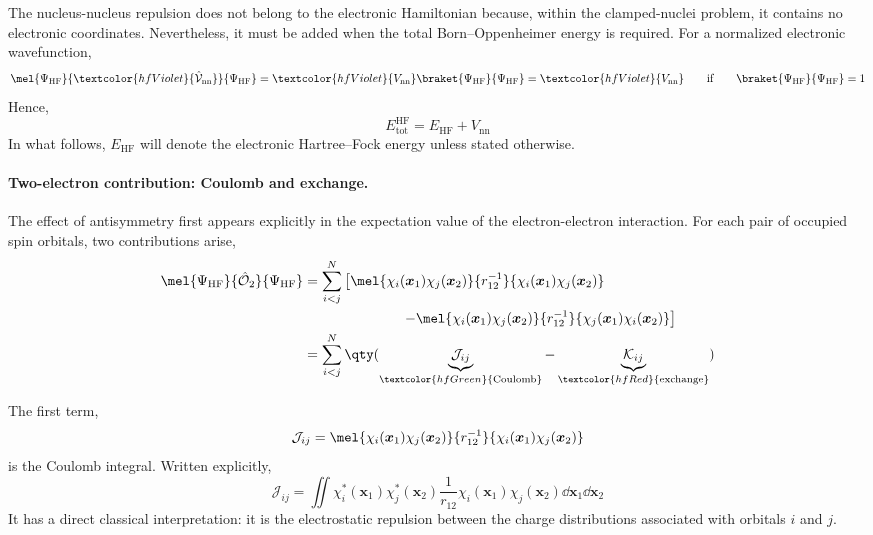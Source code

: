 \documentclass[11pt,a4paper,titlepage]{article}
\numberwithin{equation}{section}
\newcommand{\EHF}{E_\text{HF}}
\newcommand{\bx}{\boldsymbol{x}}
\newcommand{\chO}{\Hat{\mathcal{O}}}
\newcommand{\chV}{\Hat{\mathcal{V}}}
\newcommand{\cJ}{\mathcal{J}}
\newcommand{\cK}{\mathcal{K}}
\newcommand{\red}[1]{\textcolor{hfRed}{#1}}
\newcommand{\green}[1]{\textcolor{hfGreen}{#1}}
\newcommand{\violet}[1]{\textcolor{hfViolet}{#1}}
\begin{document}
The nucleus-nucleus repulsion does not belong to the electronic Hamiltonian
because, within the clamped-nuclei problem, it contains no electronic
coordinates. Nevertheless, it must be added when the total
Born--Oppenheimer energy is required. For a normalized electronic
wavefunction,
\begin{equation}
  \mel{\Psi_\text{HF}}{\violet{\chV_\text{nn}}}{\Psi_\text{HF}}
  =
  \violet{V_\text{nn}}
  \braket{\Psi_\text{HF}}{\Psi_\text{HF}}
  =
  \violet{V_\text{nn}}
  \qquad\text{if}\qquad
  \braket{\Psi_\text{HF}}{\Psi_\text{HF}}=1
\end{equation}
Hence,
\begin{equation}
  E_\text{tot}^\text{HF}
  =
  \EHF+V_\text{nn}
\end{equation}
In what follows, $\EHF$ will denote the electronic Hartree--Fock energy
unless stated otherwise.

\paragraph{Two-electron contribution: Coulomb and exchange.}

The effect of antisymmetry first appears explicitly in the expectation value
of the electron-electron interaction. For each pair of occupied spin
orbitals, two contributions arise,
\begin{equation}
\begin{split}
  \mel{\Psi_\text{HF}}{\chO_2}{\Psi_\text{HF}}
  &=
  \sum_{i<j}^{N}
  \left[
    \mel{\chi_i(\bx_1)\chi_j(\bx_2)}{r_{12}^{-1}}
        {\chi_i(\bx_1)\chi_j(\bx_2)}
  \right.
  \\
  &\hspace{7em}\left.
    -
    \mel{\chi_i(\bx_1)\chi_j(\bx_2)}{r_{12}^{-1}}
        {\chi_j(\bx_1)\chi_i(\bx_2)}
  \right]
  \\
  &=
  \sum_{i<j}^{N}
  \qty(
    \underbrace{\cJ_{ij}}_{\green{\text{Coulomb}}}
    -
    \underbrace{\cK_{ij}}_{\red{\text{exchange}}}
  )
  \label{eq:hf-two-electron-energy}
\end{split}
\end{equation}

The first term,
\begin{equation}
  \cJ_{ij}
  =
  \mel{\chi_i(\bx_1)\chi_j(\bx_2)}{r_{12}^{-1}}
       {\chi_i(\bx_1)\chi_j(\bx_2)}
\end{equation}
is the \green{Coulomb integral}. Written explicitly,
\begin{equation}
  \cJ_{ij}
  =
  \iint
  \chi_i^*(\bx_1)\chi_j^*(\bx_2)
  \frac{1}{r_{12}}
  \chi_i(\bx_1)\chi_j(\bx_2)
  \dd{\bx_1}\dd{\bx_2}
  \label{eq:coulomb-integral}
\end{equation}
It has a direct classical interpretation: it is the electrostatic repulsion
between the charge distributions associated with orbitals $i$ and $j$.
\end{document}
